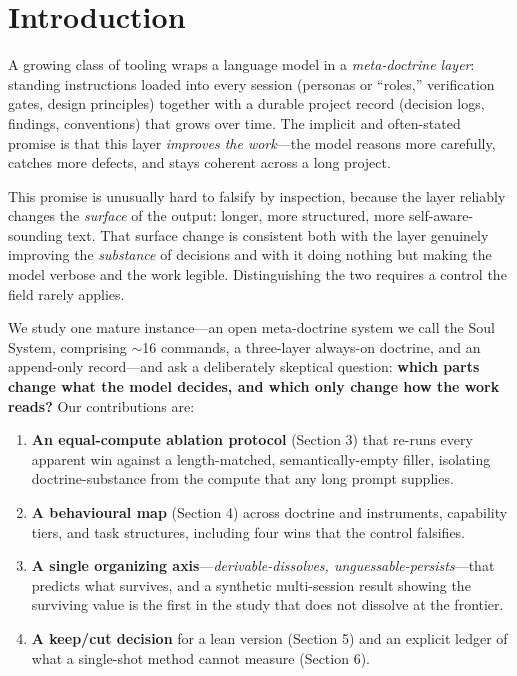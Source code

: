 \documentclass[11pt]{article}
\begin{document}
\section{Introduction}

A growing class of tooling wraps a language model in a \emph{meta-doctrine layer}: standing
instructions loaded into every session (personas or ``roles,'' verification gates, design
principles) together with a durable project record (decision logs, findings,
conventions) that grows over time. The implicit and often-stated promise is that this
layer \emph{improves the work}---the model reasons more carefully, catches more defects, and
stays coherent across a long project.

This promise is unusually hard to falsify by inspection, because the layer reliably
changes the \emph{surface} of the output: longer, more structured, more self-aware-sounding
text. That surface change is consistent both with the layer genuinely improving the
\emph{substance} of decisions and with it doing nothing but making the model verbose and the
work legible. Distinguishing the two requires a control the field rarely applies.

We study one mature instance---an open meta-doctrine system we call the Soul System,
comprising $\sim$16 commands, a three-layer always-on doctrine, and an append-only record---and
ask a deliberately skeptical question: \textbf{which parts change what the model
decides, and which only change how the work reads?} Our contributions are:

\begin{enumerate}
\item \textbf{An equal-compute ablation protocol} (Section 3) that re-runs every apparent win
   against a length-matched, semantically-empty filler, isolating doctrine-substance
   from the compute that any long prompt supplies.
\item \textbf{A behavioural map} (Section 4) across doctrine and instruments, capability tiers,
   and task structures, including four wins that the control falsifies.
\item \textbf{A single organizing axis}---\emph{derivable-dissolves, unguessable-persists}---that
   predicts what survives, and a synthetic multi-session result showing the surviving
   value is the first in the study that does not dissolve at the frontier.
\item \textbf{A keep/cut decision} for a lean version (Section 5) and an explicit ledger of
   what a single-shot method cannot measure (Section 6).
\end{enumerate}
\end{document}
